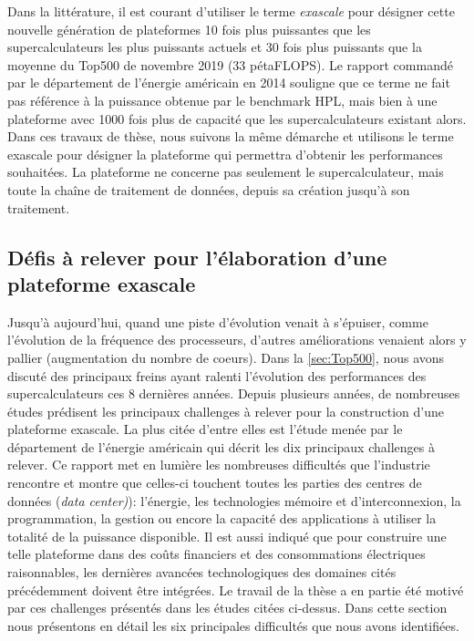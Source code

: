         Dans la littérature, il est courant d'utiliser le terme \textit{exascale} pour désigner cette nouvelle génération de plateformes 10 fois plus puissantes que les supercalculateurs les plus puissants actuels et 30 fois plus puissants que la moyenne du Top500 de novembre 2019 (33 pétaFLOPS). Le rapport commandé par le département de l'énergie américain en 2014 \cite{Lucas2014} souligne que ce terme ne fait pas référence à la puissance obtenue par le benchmark HPL, mais bien à une plateforme avec 1000 fois plus de capacité que les supercalculateurs existant alors. Dans ces travaux de thèse, nous suivons la même démarche et utilisons le terme exascale pour désigner la plateforme qui permettra d'obtenir les performances souhaitées. La plateforme ne concerne pas seulement le supercalculateur, mais toute la chaîne de traitement de données, depuis sa création jusqu'à son traitement.


\subsection{Défis à relever pour l'élaboration d'une plateforme exascale} \label{sec:challenges}

        
    Jusqu'à aujourd'hui, quand une piste d'évolution venait à s'épuiser, comme l'évolution de la fréquence des processeurs, d'autres améliorations venaient alors y pallier (augmentation du nombre de coeurs). Dans la \autoref{sec:Top500}, nous avons discuté des principaux freins ayant ralenti l'évolution des performances des supercalculateurs ces 8 dernières années. Depuis plusieurs années, de nombreuses études \cite{Shalf2010, bergman2008exascale, Bergman2011} prédisent les principaux challenges à relever pour la construction d'une plateforme exascale. La plus citée d'entre elles est l'étude menée par le département de l'énergie américain \cite{Lucas2014} qui décrit les dix principaux challenges à relever. Ce rapport met en lumière les nombreuses difficultés que l'industrie rencontre et montre que celles-ci touchent toutes les parties des centres de données (\textit{data center)}): l'énergie, les technologies mémoire et d'interconnexion, la programmation, la gestion ou encore la capacité des applications à utiliser la totalité de la puissance disponible. 
    Il est aussi indiqué que pour construire une telle plateforme dans des coûts financiers et des consommations électriques raisonnables, les dernières avancées technologiques des domaines cités précédemment doivent être intégrées. Le travail de la thèse a en partie été motivé par ces challenges présentés dans les études citées ci-dessus. Dans cette section nous présentons en détail les six principales difficultés que nous avons identifiées. 

